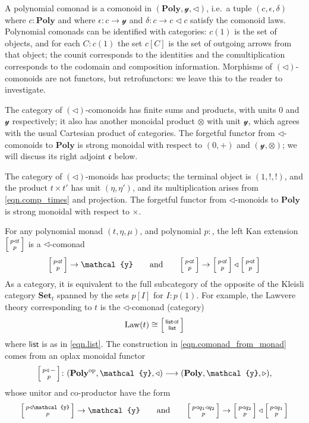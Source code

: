 \documentclass[11pt, one side, article]{memoir}
\makeatletter
\theoremstyle{definition}
\theoremstyle{plain}
\newcommand{\Cat}[1]{\mathbf{#1}}%
\newcommand{\Fun}[1]{\mathsf{#1}}%
\newcommand{\too}{\longrightarrow}
\newcommand{\op}{^\tn{op}}
\newcommand{\tn}[1]{\textnormal{#1}}
\newcommand{\smset}{\Cat{Set}}
\newcommand{\List}{\Fun{list}}
\newcommand{\yon}{{\mathcal{y}}}
\newcommand{\poly}{\Cat{Poly}}
\newcommand{\0}{\textsf{0}}
\newcommand{\1}{\tn{\textsf{1}}}
\newcommand{\tri}{\mathbin{\triangleleft}}
\newcommand{\irt}{\mathbin{\triangleright}}
\newcommand{\cofree}{\mathfrak{c}}
\newcommand{\uu}{\List}
\newcommand{\biglens}[2]{
     \begin{bmatrix}{\vphantom{f_f^f}#2} \\ {\vphantom{f_f^f}#1} \end{bmatrix}
}
\newcommand{\littlelens}[2]{
     \begin{bsmallmatrix}{\vphantom{f}#2} \\ {\vphantom{f}#1} \end{bsmallmatrix}
}
\newcommand{\lens}[2]{
  \relax\if@display
     \biglens{#1}{#2}
  \else
     \littlelens{#1}{#2}
  \fi
}
\newcommand{\hh}[2][]{#1 \tn{#2} #1}
\newcommand{\qqand}{\hh[\qquad]{and}}
\makeatother
\begin{document}
A polynomial comonad is a comonoid in $(\poly,\yon,\tri)$, i.e.\ a tuple $(c,\epsilon,\delta)$ where $c:\poly$ and where $\epsilon\colon c\to\yon$ and $\delta\colon c\to c\tri c$ satisfy the comonoid laws. Polynomial comonads can be identified with categories: $c(1)$ is the set of objects, and for each $C:c(1)$ the set $c[C]$ is the set of outgoing arrows from that object; the counit corresponds to the identities and the comultiplication corresponds to the codomain and composition information. Morphisms of $(\tri)$-comonoids are not functors, but retrofunctors: we leave this to the reader to investigate.

The category of $(\tri)$-comonoids has finite sums and products, with units $0$ and $\yon$ respectively; it also has another monoidal product $\otimes$ with unit $\yon$, which agrees with the usual Cartesian product of categories. The forgetful functor from $\tri$-comonoids to $\poly$ is strong monoidal with respect to $(0,+)$ and $(\yon,\otimes)$; we will discuss its right adjoint $\cofree$ below.

The category of $(\tri)$-monoids has products; the terminal object is $(1,!,!)$, and the product $t\times t'$ has unit $(\eta,\eta')$, and its multiplication arises from \eqref{eqn.comp_times} and projection. The forgetful functor from $\tri$-monoids to $\poly$ is strong monoidal with respect to $\times$. 

For any polynomial monad $(t,\eta,\mu)$, and polynomial $p\colon$, the left Kan extension $\lens{p}{p\tri t}$ is a $\tri$-comonad
\begin{equation}\label{eqn.comonad_from_monad}
  \lens{p}{p\tri t}\to\yon
  \qqand
  \lens{p}{p\tri t}\to\lens{p}{p\tri t}\tri\lens{p}{p\tri t}
\end{equation}
As a category, it is equivalent to the full subcategory of the opposite of the Kleisli category $\smset_t$ spanned by the sets $p[I]$ for $I:p(1)$. For example, the Lawvere theory corresponding to $t$ is the $\tri$-comonad (category)
\begin{equation}
	\text{Law}(t)\cong\lens{\uu}{\uu\tri t}
\end{equation}
where $\uu$ is as in \eqref{eqn.list}. The construction in \eqref{eqn.comonad_from_monad} comes from an oplax monoidal functor
\begin{equation}
	\lens{p}{p\tri\,-}\colon(\poly\op,\yon,\tri)\too(\poly,\yon,\irt),
\end{equation}
whose unitor and co-productor have the form
\begin{equation}
	\lens{p}{p\tri\yon}\to\yon
  \qqand
	\lens{p}{p\tri q_1\tri q_2}\to\lens{p}{p\tri q_2}\tri\lens{p}{p\tri q_1}
\end{equation}
\end{document}

